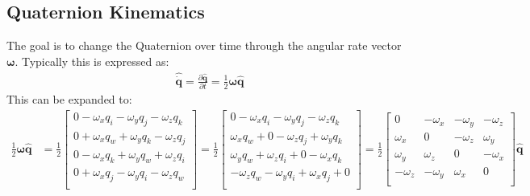 \documentclass[10pt,a4paper]{article}
\newcommand{\V}[1]{\mathbf{#1}}
\newcommand{\Vh}[1]{\mathbf{\hat{#1}}}
\begin{document}
\subsection {Quaternion Kinematics}
The goal is to change the Quaternion over time through the angular rate vector $\V \omega$.
Typically this is expressed as: 
\begin{align}
  \Vh{ \dot q} = \frac {\partial \Vh q} {\partial t} = \frac 1 2 \V \omega \Vh q
\end{align}
This can be expanded to: 
\begin{align}
  \frac 1 2 \V \omega \Vh q &= \frac 1 2
                              \begin{bmatrix}
                                0 - \omega_x q_i - \omega_y q_j - \omega_z q_k \\ 
                                0 + \omega_x q_w + \omega_y q_k - \omega_z q_j \\ 
                                0 - \omega_x q_k + \omega_y q_w + \omega_z q_i \\ 
                                0 + \omega_x q_j - \omega_y q_i - \omega_z q_w \\ 
                              \end{bmatrix} = \frac 1 2 \begin{bmatrix}
                                0 - \omega_x q_i - \omega_y q_j - \omega_z q_k \\ 
                                \omega_x q_w + 0 - \omega_z q_j + \omega_y q_k \\ 
                                \omega_y q_w + \omega_z q_i + 0 - \omega_x q_k \\ 
                                 - \omega_z q_w - \omega_y q_i + \omega_x q_j + 0 \\ 
                              \end{bmatrix} = \frac 1 2 \begin{bmatrix}
                                0 & - \omega_x  & - \omega_y  & - \omega_z  \\ 
                                \omega_x  &  0 & - \omega_z  &  \omega_y  \\ 
                                \omega_y  &  \omega_z  &  0 & - \omega_x  \\ 
                                 - \omega_z  & - \omega_y  &  \omega_x  &  0 \\ 
                              \end{bmatrix} \Vh q 
\end{align}
\end{document}
